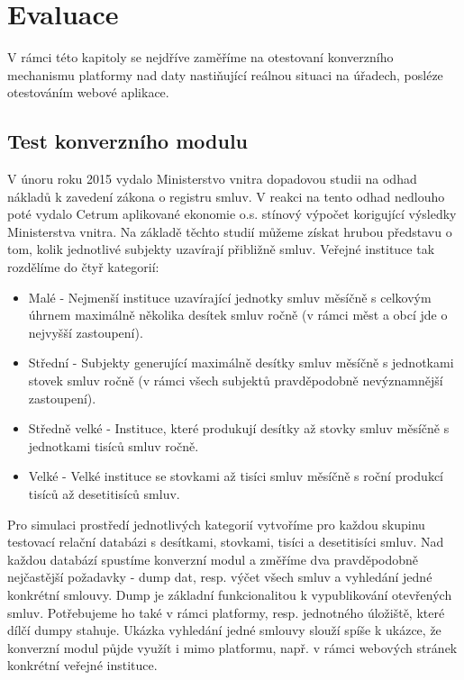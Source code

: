 \chapter{Evaluace}

V rámci této kapitoly se nejdříve zaměříme na otestovaní konverzního mechanismu platformy nad daty nastiňující reálnou situaci na úřadech, posléze otestováním webové aplikace.

\section{Test konverzního modulu}

V únoru roku 2015 vydalo Ministerstvo vnitra dopadovou studii na odhad nákladů k zavedení zákona o registru smluv\cite{dopad}. V reakci na tento odhad nedlouho poté vydalo Cetrum aplikované ekonomie o.s. stínový výpočet korigující výsledky Ministerstva vnitra\cite{stinovyvypocet}. Na základě těchto studií můžeme získat hrubou představu o tom, kolik jednotlivé subjekty uzavírají přibližně smluv. Veřejné instituce tak rozdělíme do čtyř kategorií:  

\begin{itemize}
\item Malé - Nejmenší instituce uzavírající jednotky smluv měsíčně s celkovým úhrnem maximálně několika desítek smluv ročně (v rámci měst a obcí jde o nejvyšší zastoupení).
\item Střední - Subjekty generující maximálně desítky smluv měsíčně s jednotkami stovek smluv ročně (v rámci všech subjektů pravděpodobně nevýznamnější zastoupení). 
\item Středně velké - Instituce, které produkují desítky až stovky smluv měsíčně s jednotkami tisíců smluv ročně.
\item Velké - Velké instituce se stovkami až tisíci smluv měsíčně s roční produkcí tisíců až desetitisíců smluv.
\end{itemize}

Pro simulaci prostředí jednotlivých kategorií vytvoříme pro každou skupinu testovací relační databázi s desítkami, stovkami, tisíci a desetitisíci smluv. Nad každou databází spustíme konverzní modul a změříme dva pravděpodobně nejčastější požadavky - dump dat, resp. výčet všech smluv a vyhledání jedné konkrétní smlouvy. Dump je základní funkcionalitou k vypublikování otevřených smluv. Potřebujeme ho také v rámci platformy, resp. jednotného úložiště, které dílčí dumpy stahuje. Ukázka vyhledání jedné smlouvy slouží spíše k ukázce, že konverzní modul půjde využít i mimo platformu, např. v rámci webových stránek konkrétní veřejné instituce.   

